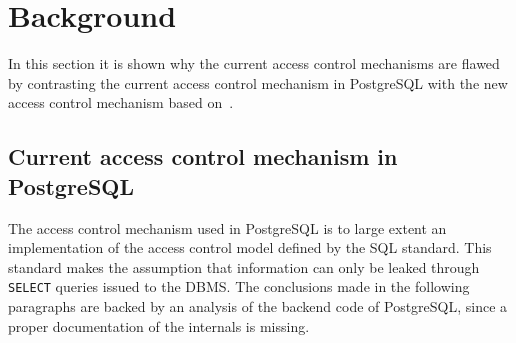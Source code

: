 \section{Background}

In this section it is shown why the current access control mechanisms are flawed by contrasting the current access control mechanism in PostgreSQL with the new access control mechanism based on~\cite{guarnieri2016strong}.
%
\subsection{Current access control mechanism in PostgreSQL}
%
The access control mechanism used in PostgreSQL is to large extent an implementation of the access control model defined by the SQL standard.
%
This standard makes the assumption that information can only be leaked through \texttt{SELECT} queries issued to the DBMS.
%
The conclusions made in the following paragraphs are backed by an analysis of the backend code of PostgreSQL, since a proper documentation of the internals is missing.


